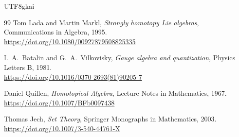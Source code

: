 \documentclass[12pt]{article}
\begin{document}
\begin{CJK*}{UTF8}{gkai}
\begin{thebibliography}{99}
Tom Lada and Martin Markl,
\emph{Strongly homotopy Lie algebras},
Communications in Algebra, 1995.
\\ \url{https://doi.org/10.1080/00927879508825335}

I.\ A.\ Batalin and G.\ A.\ Vilkovisky,
\emph{Gauge algebra and quantization},
Physics Letters B, 1981.
\\ \url{https://doi.org/10.1016/0370-2693(81)90205-7}

Daniel Quillen,
\emph{Homotopical Algebra},
Lecture Notes in Mathematics, 1967.
\\ \url{https://doi.org/10.1007/BFb0097438}

Thomas Jech,
\emph{Set Theory},
Springer Monographs in Mathematics, 2003.
\\ \url{https://doi.org/10.1007/3-540-44761-X}

\end{thebibliography}

\end{CJK*}
\end{document}
